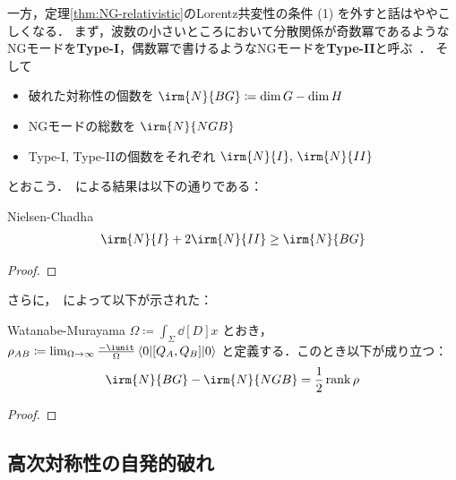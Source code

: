 \documentclass[TQFT_main]{subfiles}
\begin{document}
一方，定理\ref{thm:NG-relativistic}のLorentz共変性の条件 (1) を外すと話はややこしくなる．
まず，波数の小さいところにおいて分散関係が奇数冪であるようなNGモードを\textbf{Type-I}，偶数冪で書けるようなNGモードを\textbf{Type-II}と呼ぶ~\cite{nielsen1976HowCount}．
そして 
\begin{itemize}
    \item 破れた対称性の個数を $\irm{N}{BG} \coloneqq \dim G - \dim H$
    \item NGモードの総数を $\irm{N}{NGB}$
    \item Type-I, Type-IIの個数をそれぞれ $\irm{N}{I},\, \irm{N}{II}$
\end{itemize}
とおこう．~\cite{nielsen1976HowCount}による結果は以下の通りである：

\begin{mytheo}[label=thm:NG-nonrel]{Nielsen-Chadha}
    \begin{align}
        \irm{N}{I} + 2 \irm{N}{II} \ge \irm{N}{BG}
    \end{align}
\end{mytheo}

\begin{proof}
    
\end{proof}

さらに，~\cite{watanabe2012UnifiedDescription}によって以下が示された：

\begin{mytheo}[label=thm:NG-nonrel-count]{Watanabe-Murayama}
    $\Omega \coloneqq \int_\Sigma \dd[D]{x}$ とおき，$\rho_{AB} \coloneqq \lim_{\Omega \to \infty} \frac{-\iunit}{\Omega} \mel{0}{\comm{Q_A}{Q_B}}{0}$ と定義する．このとき以下が成り立つ：
    \begin{align}
        \irm{N}{BG} - \irm{N}{NGB} = \frac{1}{2} \rank \rho
    \end{align}
\end{mytheo}

\begin{proof}
    
\end{proof}

\subsection{高次対称性の自発的破れ}
\end{document}

